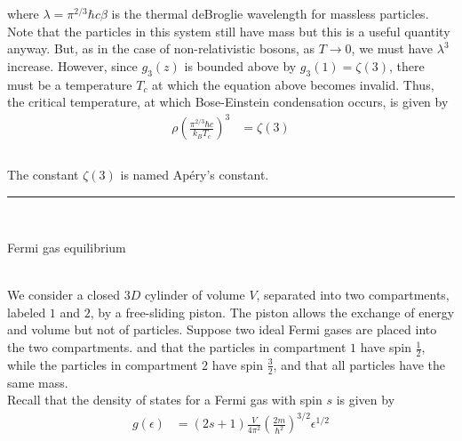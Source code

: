 \documentclass[]{article}
\begin{document}
\begin{enumerate}[1.]
where $\lambda =  \pi^{2/3}   \hbar c \beta$ is the thermal deBroglie wavelength for massless particles. Note that the particles in this system still have mass but this is a useful quantity anyway. But, as in the case of non-relativistic bosons, as $T \to 0$, we must have $\lambda^3$ increase. However, since $g_3(z)$ is bounded above by $g_3(1) = \zeta(3)$, there must be a temperature $T_c$ at which the equation above becomes invalid. Thus, the critical temperature, at which Bose-Einstein condensation occurs, is given by \\



\begin{equation}
\begin{aligned}
\rho \left( \frac{ \pi^{2/3} \hbar c }{ k_B T_c }  \right)^3 & = \zeta(3) \\
\end{aligned}
\end{equation} \\

The constant $\zeta(3)$ is named Apéry's constant. \\












\noindent\rule{15cm}{0.4pt} \\





{\bf \item Fermi gas equilibrium} \\

We consider a closed $3D$ cylinder of volume $V$, separated into two compartments, labeled $1$ and $2$, by a free-sliding piston. The piston allows the exchange of energy and volume but not of particles. Suppose two ideal Fermi gases are placed into the two compartments. and that the particles in compartment $1$ have spin $\frac{1}{2}$, while the particles in compartment $2$ have spin $\frac{ 3}{2}$, and that all particles have the same mass. \\

Recall that the density of states for a Fermi gas with spin $s$ is given by \\

\begin{equation}
\begin{aligned}
g( \epsilon ) & = ( 2 s + 1 ) \frac{ V}{ 4\pi^2 } \left(  \frac{ 2m }{ \hbar^2 } \right)^{3/2} \epsilon^{1/2} \\
\end{aligned}
\end{equation} \\


\end{enumerate}
\end{document}
